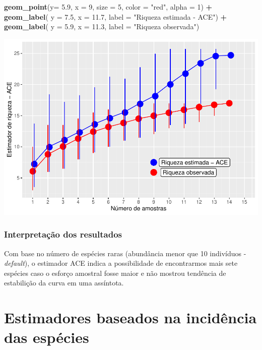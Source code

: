 \documentclass[
]{book}
\newenvironment{Shaded}{\begin{snugshade}}{\end{snugshade}}
\newcommand{\DataTypeTok}[1]{\textcolor[rgb]{0.13,0.29,0.53}{#1}}
\newcommand{\DecValTok}[1]{\textcolor[rgb]{0.00,0.00,0.81}{#1}}
\newcommand{\FloatTok}[1]{\textcolor[rgb]{0.00,0.00,0.81}{#1}}
\newcommand{\KeywordTok}[1]{\textcolor[rgb]{0.13,0.29,0.53}{\textbf{#1}}}
\newcommand{\NormalTok}[1]{#1}
\newcommand{\OperatorTok}[1]{\textcolor[rgb]{0.81,0.36,0.00}{\textbf{#1}}}
\newcommand{\StringTok}[1]{\textcolor[rgb]{0.31,0.60,0.02}{#1}}
\begin{document}
\begin{Shaded}
\begin{Highlighting}[]
\StringTok{  }\KeywordTok{geom_point}\NormalTok{(}\DataTypeTok{y=} \FloatTok{5.9}\NormalTok{, }\DataTypeTok{x =} \DecValTok{9}\NormalTok{, }\DataTypeTok{size =} \DecValTok{5}\NormalTok{, }\DataTypeTok{color =} \StringTok{"red"}\NormalTok{, }\DataTypeTok{alpha =} \DecValTok{1}\NormalTok{) }\OperatorTok{+}\StringTok{ }
\StringTok{  }\KeywordTok{geom_label}\NormalTok{( }\DataTypeTok{y =} \FloatTok{7.5}\NormalTok{, }\DataTypeTok{x =} \FloatTok{11.7}\NormalTok{, }\DataTypeTok{label =} \StringTok{"Riqueza estimada - ACE"}\NormalTok{) }\OperatorTok{+}
\StringTok{  }\KeywordTok{geom_label}\NormalTok{( }\DataTypeTok{y =} \FloatTok{5.9}\NormalTok{, }\DataTypeTok{x =} \FloatTok{11.3}\NormalTok{, }\DataTypeTok{label =} \StringTok{"Riqueza observada"}\NormalTok{)}
\end{Highlighting}
\end{Shaded}

\includegraphics{livro_r_ecologia_files/figure-latex/unnamed-chunk-46-1.pdf}

\hypertarget{interpretauxe7uxe3o-dos-resultados-1}{%
\subsubsection{Interpretação dos resultados}\label{interpretauxe7uxe3o-dos-resultados-1}}

Com base no número de espécies raras (abundância menor que 10 indivíduos - \emph{default}), o estimador ACE indica a possibilidade de encontrarmos mais sete espécies caso o esforço amostral fosse maior e não mostrou tendência de estabilição da curva em uma assíntota.

\hypertarget{estimadores-baseados-na-inciduxeancia-das-espuxe9cies}{%
\section{Estimadores baseados na incidência das espécies}\label{estimadores-baseados-na-inciduxeancia-das-espuxe9cies}}
\end{document}
